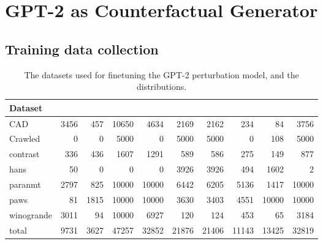 \section{GPT-2 as Counterfactual Generator}
\label{appendix:train_data}

\subsection{Training data collection}
\begin{table*}
\small
\centering
\setlength{\tabcolsep}{3.5pt}
\begin{tabular}{lrrrrrrrrr}
\toprule
\textbf{Dataset} & \textbf{\ctrltag{negation}} & \textbf{\ctrltag{quantifier}} & \textbf{\ctrltag{leixcal}} & \textbf{\ctrltag{resemantic}} & \textbf{\ctrltag{insert}} & \textbf{\ctrltag{delete}} & \textbf{\ctrltag{restructure}} & \textbf{\ctrltag{shuffle}} & \emph{\ctrltag{global}} \\ 
\midrule
        CAD &      3456 &         457 &    10650 &        4634 &    2169 &    2162 &          234 &       84 &    3756 \\
    Crawled &         0 &           0 &     5000 &           0 &    5000 &    5000 &            0 &      108 &    5000 \\
   contrast &       336 &         436 &     1607 &        1291 &     589 &     586 &          275 &      149 &     877 \\
       hans &        50 &           0 &        0 &           0 &    3926 &    3926 &          494 &     1602 &       2 \\
    paranmt &      2797 &         825 &    10000 &       10000 &    6442 &    6205 &         5136 &     1417 &   10000 \\
       paws &        81 &        1815 &    10000 &       10000 &    3630 &    3403 &         4551 &    10000 &   10000 \\
 winogrande &      3011 &          94 &    10000 &        6927 &     120 &     124 &          453 &       65 &    3184 \\
      total &      9731 &        3627 &    47257 &       32852 &   21876 &   21406 &        11143 &    13425 &   32819 \\
\bottomrule
\end{tabular}
\caption{The datasets used for finetuning the GPT-2 perturbation model, and the \tagstr distributions.}
\label{table:gpt_train_stats}
\end{table*}


